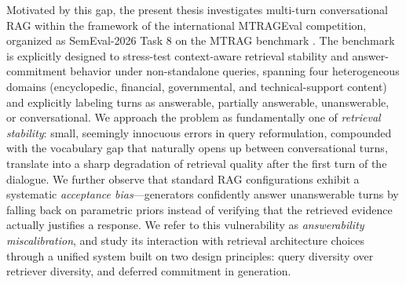 Motivated by this gap, the present thesis investigates multi-turn conversational RAG within the framework of the international MTRAGEval competition, organized as SemEval-2026 Task 8 \citep{rosenthal2026semeval} on the MTRAG benchmark \citep{katsis2025mtrag}. The benchmark is explicitly designed to stress-test context-aware retrieval stability and answer-commitment behavior under non-standalone queries, spanning four heterogeneous domains (encyclopedic, financial, governmental, and technical-support content) and explicitly labeling turns as answerable, partially answerable, unanswerable, or conversational. We approach the problem as fundamentally one of \textit{retrieval stability}: small, seemingly innocuous errors in query reformulation, compounded with the vocabulary gap that naturally opens up between conversational turns, translate into a sharp degradation of retrieval quality after the first turn of the dialogue. We further observe that standard RAG configurations exhibit a systematic \textit{acceptance bias}---generators confidently answer unanswerable turns by falling back on parametric priors instead of verifying that the retrieved evidence actually justifies a response. We refer to this vulnerability as \textit{answerability miscalibration}, and study its interaction with retrieval architecture choices through a unified system built on two design principles: query diversity over retriever diversity, and deferred commitment in generation.

